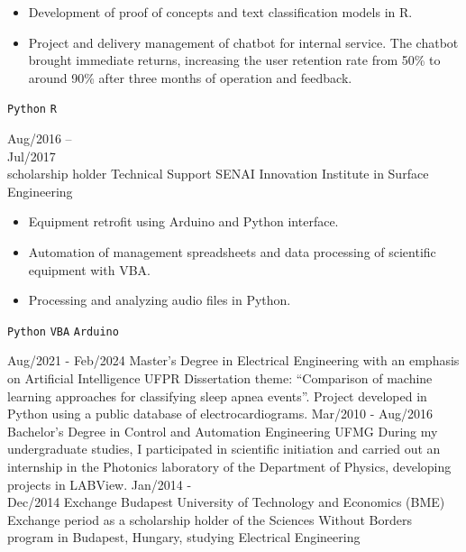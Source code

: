 \documentclass[9pt]{developercv} %
\begin{document}
\begin{entrylist}
		{\vspace{-10pt}
			\begin{itemize}[noitemsep,topsep=0pt,parsep=0pt,partopsep=0pt, leftmargin=-1pt]
				\item Development of proof of concepts and text classification models in R.
				\item Project and delivery management of chatbot for internal service. The chatbot brought immediate returns, increasing the user retention rate from 50\% to around 90\% after three months of operation and feedback.
			\end{itemize} 
			\texttt{Python} \slashsep \texttt{R}}
		\entry
		{Aug/2016 -- \\Jul/2017 \\\footnotesize{scholarship holder}}
		{Technical Support}
		{SENAI Innovation Institute in Surface Engineering}
		{\vspace{-10pt}
			\begin{itemize}[noitemsep,topsep=0pt,parsep=0pt,partopsep=0pt, leftmargin=-1pt]
				\item Equipment retrofit using Arduino and Python interface.
				\item Automation of management spreadsheets and data processing of scientific equipment with VBA.
				\item Processing and analyzing audio files in Python.
			\end{itemize} 
			\texttt{Python} \slashsep \texttt{VBA} \slashsep \texttt{Arduino}}
	\end{entrylist}
	
	\vspace{-10 pt}
	\begin{entrylist}
		\entry
		{Aug/2021 - Feb/2024}
		{Master's Degree in Electrical Engineering with an emphasis on Artificial Intelligence}
		{UFPR}
		{Dissertation theme: “Comparison of machine learning approaches for classifying sleep apnea events”. Project developed in Python using a public database of electrocardiograms.}
		\entry
		{Mar/2010 - Aug/2016}
		{Bachelor's Degree in Control and Automation Engineering}
		{UFMG}
		{During my undergraduate studies, I participated in scientific initiation and carried out an internship in the Photonics laboratory of the Department of Physics, developing projects in LABView.}
		\entry
		{Jan/2014 - \\ Dec/2014}
		{Exchange}
		{Budapest University of Technology and Economics (BME)}
		{Exchange period as a scholarship holder of the Sciences Without Borders program in Budapest, Hungary, studying Electrical Engineering}
	\end{entrylist}
	
\end{document}
